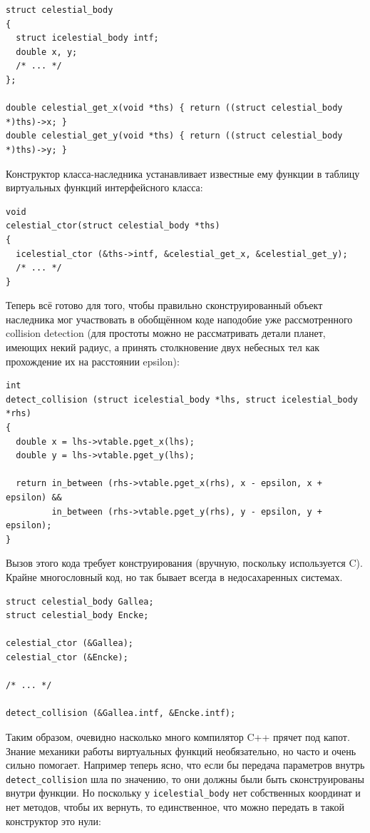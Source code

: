 \documentclass[a4paper,12pt,oneside]{article}
\begin{document}
\begin{lstlisting}
struct celestial_body
{
  struct icelestial_body intf;
  double x, y;
  /* ... */
};

double celestial_get_x(void *ths) { return ((struct celestial_body *)ths)->x; }
double celestial_get_y(void *ths) { return ((struct celestial_body *)ths)->y; }
\end{lstlisting}

Конструктор класса-наследника устанавливает известные ему функции в таблицу виртуальных функций интерфейсного класса:

\begin{lstlisting}
void 
celestial_ctor(struct celestial_body *ths)
{
  icelestial_ctor (&ths->intf, &celestial_get_x, &celestial_get_y);
  /* ... */  
}
\end{lstlisting}

Теперь всё готово для того, чтобы правильно сконструированный объект наследника мог участвовать в обобщённом коде наподобие уже рассмотренного collision detection (для простоты можно не рассматривать детали планет, имеющих некий радиус, а принять столкновение двух небесных тел как прохождение их на расстоянии epsilon):

\begin{lstlisting}
int
detect_collision (struct icelestial_body *lhs, struct icelestial_body *rhs)
{
  double x = lhs->vtable.pget_x(lhs);
  double y = lhs->vtable.pget_y(lhs);
 
  return in_between (rhs->vtable.pget_x(rhs), x - epsilon, x + epsilon) && 
         in_between (rhs->vtable.pget_y(rhs), y - epsilon, y + epsilon);
}
\end{lstlisting}

Вызов этого кода требует конструирования (вручную, поскольку используется C). Крайне многословный код, но так бывает всегда в недосахаренных системах.

\begin{lstlisting}
struct celestial_body Gallea;
struct celestial_body Encke;

celestial_ctor (&Gallea);
celestial_ctor (&Encke);

/* ... */

detect_collision (&Gallea.intf, &Encke.intf);
\end{lstlisting}

Таким образом, очевидно насколько много компилятор C++ прячет под капот. Знание механики работы виртуальных функций необязательно, но часто и очень сильно помогает. Например теперь ясно, что если бы передача параметров внутрь \lstinline!detect_collision! шла по значению, то они должны были быть сконструированы внутри функции. Но поскольку у \lstinline!icelestial_body! нет собственных координат и нет методов, чтобы их вернуть, то единственное, что можно передать в такой конструктор это нули:
\end{document}
